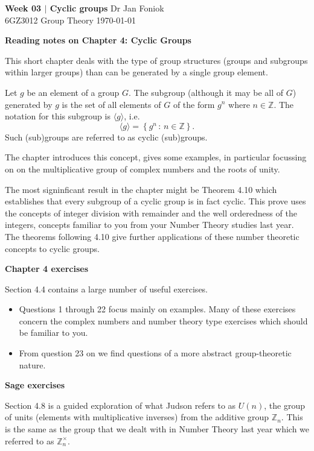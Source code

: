 \documentclass[oneside,10pt]{amsart}
\newcommand{\cbox}[1]{\begin{tcolorbox}[left=0.5mm,right=0.5mm,top=0.5mm,bottom=0.5mm, boxsep=2pt, boxrule=0pt,colback=black]\color{white}\sffamily #1 \end{tcolorbox}}
\newcommand{\tuttitle}[4]{\cbox{\textbf{#1} \hfill {#2}\\{#3} \hfill {\Small #4}}\vskip 4pt}
\newcommand{\topic}[1]{\cbox{\textbf{#1}}\vskip 4pt}
\begin{document}
\tuttitle{Week 03 $|$ Cyclic groups}{Dr Jan Foniok}{6GZ3012 Group Theory}{\today}
\vskip 16pt

\topic{Reading notes on Chapter 4: Cyclic Groups}
This short chapter deals with the type of group structures (groups and subgroups within larger groups) than can be generated by a single group element.

Let $g$ be an element of a group $G$. The subgroup (although it may be all of $G$) generated by $g$ is the set of all elements of $G$ of the form $g^n$ where $n \in \mathbb{Z}$. The notation for this subgroup is $\langle g \rangle$, i.e.
$$\langle g \rangle = \left \{ g^n \, : \, n \in \mathbb{Z} \right \}.$$ Such (sub)groups are referred to as cyclic (sub)groups.

The chapter introduces this concept, gives some examples, in particular focussing on on the multiplicative group of complex numbers and the roots of unity.

The most signinficant result in the chapter might be Theorem 4.10 which establishes that every subgroup of a cyclic group is in fact cyclic. This prove uses the concepts of integer division with remainder and the well orderedness of the integers, concepts familiar to you from your Number Theory studies last year. The theorems following 4.10 give further applications of these number theoretic concepts to cyclic groups.

\vskip 4pt

\topic{Chapter 4 exercises}
Section 4.4 contains a large number of useful exercises.

\begin{itemize}
\item
Questions 1 through 22 focus mainly on examples. Many of these exercises concern the complex numbers and number theory type exercises which should be familiar to you.
\item
From question 23 on we find questions of a more abstract group-theoretic nature.
\end{itemize}

\vskip 4pt

\topic{Sage exercises}
Section 4.8 is a guided exploration of what Judson refers to as $U(n)$, the group of units (elements with multiplicative inverses) from the additive group $\mathbb{Z}_n$. This is the same as the group that we dealt with in Number Theory last year which we referred to as $\mathbb{Z}_n^\times$.
\end{document}
